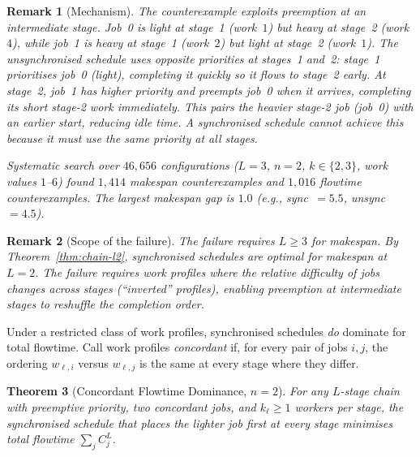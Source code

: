 \documentclass[11pt,titlepage]{article}
\newtheorem{theorem}{Theorem}
\newtheorem{remark}[theorem]{Remark}
\begin{document}
\begin{remark}[Mechanism]
\label{rem:preemption-mechanism}
The counterexample exploits preemption at an intermediate
stage. Job~0 is light at stage~1 (work~$1$) but heavy at
stage~2 (work~$4$), while job~1 is heavy at stage~1
(work~$2$) but light at stage~2 (work~$1$). The
unsynchronised schedule uses opposite priorities at
stages~1 and~2: stage~1 prioritises job~0 (light),
completing it quickly so it flows to stage~2 early.
At stage~2, job~1 has higher priority and preempts
job~0 when it arrives, completing its short stage-2
work immediately. This pairs the heavier stage-2 job
(job~0) with an earlier start, reducing idle time.
A synchronised schedule cannot achieve this because
it must use the same priority at all stages.

Systematic search over $46{,}656$ configurations ($L = 3$,
$n = 2$, $k \in \{2, 3\}$, work values $1$--$6$) found
$1{,}414$ makespan counterexamples and $1{,}016$ flowtime
counterexamples. The largest makespan gap is $1.0$ (e.g.,
sync~$= 5.5$, unsync~$= 4.5$).
\end{remark}

\begin{remark}[Scope of the failure]
The failure requires $L \geq 3$ for makespan.
By Theorem~\ref{thm:chain-l2}, synchronised schedules are
optimal for makespan at $L = 2$. The failure requires
work profiles where the relative difficulty of jobs changes
across stages (``inverted'' profiles), enabling preemption
at intermediate stages to reshuffle the completion order.
\end{remark}

Under a restricted class of work profiles, synchronised
schedules \emph{do} dominate for total flowtime. Call work
profiles \emph{concordant} if, for every pair of jobs
$i, j$, the ordering $w_{\ell,i}$ versus $w_{\ell,j}$ is the
same at every stage where they differ.

\begin{theorem}[Concordant Flowtime Dominance, $n = 2$]
\label{thm:concordant}
For any $L$-stage chain with preemptive priority, two
concordant jobs, and $k_\ell \geq 1$ workers per stage, the
synchronised schedule that places the lighter job first at
every stage minimises total flowtime $\sum_j C_j^L$.
\end{theorem}
\end{document}
